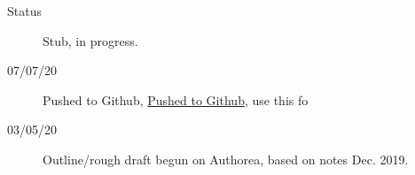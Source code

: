 \begin{description}
\item [{Status}] Stub, in progress.
\item [{07/07/20}] Pushed to Github, \href{https://github.com/phockett/Extracting-Molecular-Frame-Photoionization-Dynamics-from-Experimental-Data}{Pushed to Github}, use this fo
\item [{03/05/20}] Outline/rough draft begun on Authorea, based on notes Dec. 2019.
\end{description}